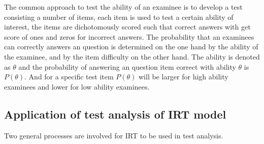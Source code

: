 \documentclass[a4paper]{article}
\begin{document}
The common approach to test the ability of an examinee is to develop a
test consisting a number of items, each item is used to test a certain
ability of interest, the items are dichotomously scored such that
correct answers with get score of ones and zeros for incorrect
answers. The probability that an examinees can correctly answers an
question is determined on the one hand by the ability of the examinee,
and by the item difficulty on the other hand. The ability is denoted
as $\theta$ and the probability of answering an question item correct
with ability $\theta$ is $P(\theta)$. And for a specific test item
$P(\theta)$ will be larger for high ability examinees and lower for
low ability examinees. 

\subsection{Application of test analysis of IRT model}
Two general processes are involved for IRT to be used in test analysis.
\end{document}
